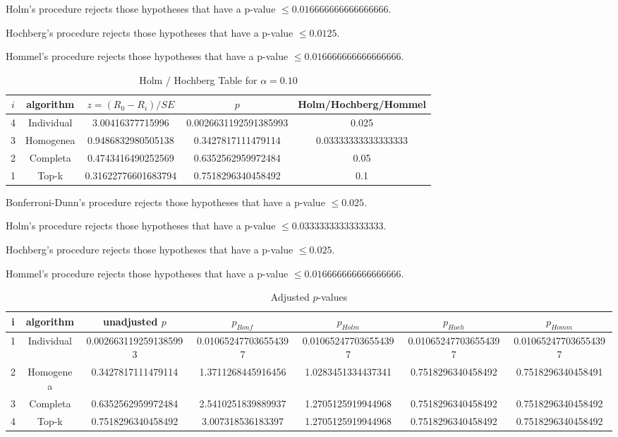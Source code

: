 \documentclass[a4paper,10pt]{article}
\begin{document}
\begin{landscape}
Holm's procedure rejects those hypotheses that have a p-value $\le0.016666666666666666$.


Hochberg's procedure rejects those hypotheses that have a p-value $\le0.0125$.


Hommel's procedure rejects those hypotheses that have a p-value $\le0.016666666666666666$.


\begin{table}[!htp]
\centering\tiny
\caption{Holm / Hochberg Table for $\alpha=0.10$}
\begin{tabular}{ccccc}
$i$&algorithm&$z=(R_0 - R_i)/SE$&$p$&Holm/Hochberg/Hommel\\
\hline
4&Individual&3.00416377715996&0.0026631192591385993&0.025\\
3&Homogenea&0.9486832980505138&0.3427817111479114&0.03333333333333333\\
2&Completa&0.4743416490252569&0.6352562959972484&0.05\\
1&Top-k&0.31622776601683794&0.7518296340458492&0.1\\
\hline
\end{tabular}
\end{table}
Bonferroni-Dunn's procedure rejects those hypotheses that have a p-value $\le0.025$.


Holm's procedure rejects those hypotheses that have a p-value $\le0.03333333333333333$.


Hochberg's procedure rejects those hypotheses that have a p-value $\le0.025$.


Hommel's procedure rejects those hypotheses that have a p-value $\le0.016666666666666666$.


\begin{table}[!htp]
\centering\tiny
\caption{Adjusted $p$-values}
\begin{tabular}{ccccccc}
i&algorithm&unadjusted $p$&$p_{Bonf}$&$p_{Holm}$&$p_{Hoch}$&$p_{Homm}$\\
\hline
1&Individual&0.0026631192591385993&0.010652477036554397&0.010652477036554397&0.010652477036554397&0.010652477036554397\\
2&Homogenea&0.3427817111479114&1.3711268445916456&1.0283451334437341&0.7518296340458492&0.7518296340458491\\
3&Completa&0.6352562959972484&2.5410251839889937&1.2705125919944968&0.7518296340458492&0.7518296340458492\\
4&Top-k&0.7518296340458492&3.007318536183397&1.2705125919944968&0.7518296340458492&0.7518296340458492\\
\hline
\end{tabular}
\end{table}


\end{landscape}
\end{document}

